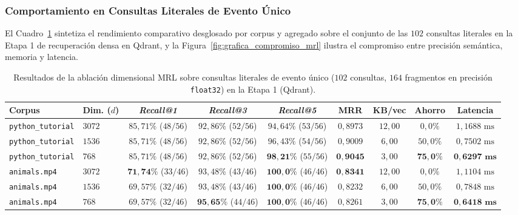 \subsubsection{Comportamiento en Consultas Literales de Evento Único}
El Cuadro~\ref{tab:ablacion_mrl_literales} sintetiza el rendimiento comparativo desglosado por corpus y agregado sobre el conjunto de las $102$ consultas literales en la Etapa 1 de recuperación densa en Qdrant, y la Figura~\ref{fig:grafica_compromiso_mrl} ilustra el compromiso entre precisión semántica, memoria y latencia.

\begin{table}[htbp]
\centering
\small
\setlength{\tabcolsep}{3.0pt}
\caption{Resultados de la ablación dimensional MRL sobre consultas literales de evento único ($102$ consultas, $164$ fragmentos en precisión \texttt{float32}) en la Etapa 1 (Qdrant).}
\label{tab:ablacion_mrl_literales}
\begin{adjustbox}{max width=\linewidth}
\begin{tabular}{llccccccc}
\toprule
\textbf{Corpus} & \textbf{Dim. ($d$)} & \textbf{\textit{Recall@1}} & \textbf{\textit{Recall@3}} & \textbf{\textit{Recall@5}} & \textbf{MRR} & \textbf{KB/vec} & \textbf{Ahorro} & \textbf{Latencia} \\
\midrule
\texttt{python\_tutorial} & $3072$ & $85,71\%$ ($48/56$) & $92,86\%$ ($52/56$) & $94,64\%$ ($53/56$) & $0,8973$ & $12,00$ & $0,0\%$ & $1,1688\text{ ms}$ \\
\texttt{python\_tutorial} & $1536$ & $85,71\%$ ($48/56$) & $92,86\%$ ($52/56$) & $96,43\%$ ($54/56$) & $0,9009$ & $6,00$ & $50,0\%$ & $0,7502\text{ ms}$ \\
\texttt{python\_tutorial} & $768$  & $85,71\%$ ($48/56$) & $92,86\%$ ($52/56$) & $\mathbf{98,21\%}$ ($55/56$) & $\mathbf{0,9045}$ & $3,00$ & $\mathbf{75,0\%}$ & $\mathbf{0,6297\text{ ms}}$ \\
\midrule
\texttt{animals.mp4}      & $3072$ & $\mathbf{71,74\%}$ ($33/46$) & $93,48\%$ ($43/46$) & $\mathbf{100,0\%}$ ($46/46$) & $\mathbf{0,8341}$ & $12,00$ & $0,0\%$ & $1,1104\text{ ms}$ \\
\texttt{animals.mp4}      & $1536$ & $69,57\%$ ($32/46$) & $93,48\%$ ($43/46$) & $\mathbf{100,0\%}$ ($46/46$) & $0,8232$ & $6,00$ & $50,0\%$ & $0,7848\text{ ms}$ \\
\texttt{animals.mp4}      & $768$  & $69,57\%$ ($32/46$) & $\mathbf{95,65\%}$ ($44/46$) & $\mathbf{100,0\%}$ ($46/46$) & $0,8261$ & $3,00$ & $\mathbf{75,0\%}$ & $\mathbf{0,6418\text{ ms}}$ \\

\end{tabular}
\end{adjustbox}
\end{table}
